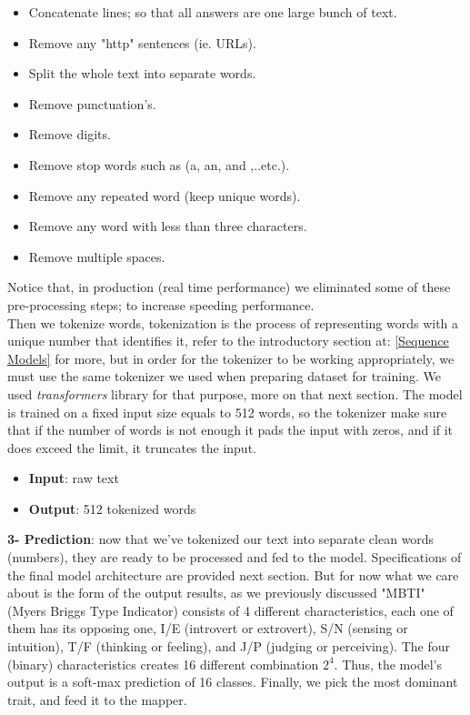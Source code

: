 \begin{itemize}
    \item Concatenate lines; so that all answers are one large bunch of text.
    \item Remove any "http" sentences (ie. URLs).
    \item Split the whole text into separate words.
    \item Remove punctuation's.
    \item Remove digits.
    \item Remove stop words such as (a, an, and ,..etc.).
    \item Remove any repeated word (keep unique words).
    \item Remove any word with less than three characters.
    \item Remove multiple spaces.\\
\end{itemize}

Notice that, in production (real time performance) we eliminated some of these pre-processing steps; to increase speeding performance.\\

Then we tokenize words, tokenization is the process of representing words with a unique number that identifies it, refer to the introductory section at: \ref{Sequence Models} for more, but in order for the tokenizer to be working appropriately, we must use the same tokenizer we used when preparing dataset for training. We used \textit{transformers} library for that purpose, more on that next section. The model is trained on a fixed input size equals to 512 words, so the tokenizer make sure that if the number of words is not enough it pads the input with zeros, and if it does exceed the limit, it truncates the input. 
 
\begin{itemize}
    \item \textbf{Input}: raw text
    \item \textbf{Output}: 512 tokenized words\\
\end{itemize}


\textbf{3- Prediction}: now that we've tokenized our text into separate clean words (numbers), they are ready to be processed and fed to the model. Specifications of the final model architecture are provided next section. But for now what we care about is the form of the output results, as we previously discussed "MBTI" (Myers Briggs Type Indicator) consists of 4 different characteristics, each one of them has its opposing one, I/E (introvert or extrovert), S/N (sensing or intuition), T/F (thinking or feeling), and J/P (judging or perceiving). The four (binary) characteristics creates 16 different combination $2^4$. Thus, the model's output is a soft-max prediction of 16 classes. Finally, we pick the most dominant trait, and feed it to the mapper.
 
